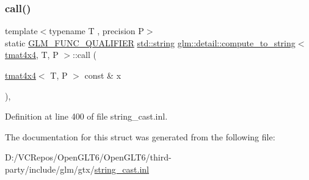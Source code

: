 \subsubsection{\texorpdfstring{call()}{call()}}
{\footnotesize\ttfamily template$<$typename T , precision P$>$ \\
static \mbox{\hyperlink{setup_8hpp_a33fdea6f91c5f834105f7415e2a64407}{G\+L\+M\+\_\+\+F\+U\+N\+C\+\_\+\+Q\+U\+A\+L\+I\+F\+I\+ER}} \mbox{\hyperlink{glad_8h_ac83513893df92266f79a515488701770}{std\+::string}} \mbox{\hyperlink{structglm_1_1detail_1_1compute__to__string}{glm\+::detail\+::compute\+\_\+to\+\_\+string}}$<$ \mbox{\hyperlink{structglm_1_1tmat4x4}{tmat4x4}}, T, P $>$\+::call (\begin{DoxyParamCaption}\item[{\mbox{\hyperlink{structglm_1_1tmat4x4}{tmat4x4}}$<$ T, P $>$ const \&}]{x }\end{DoxyParamCaption})\hspace{0.3cm}{\ttfamily [inline]}, {\ttfamily [static]}}



Definition at line 400 of file string\+\_\+cast.\+inl.



The documentation for this struct was generated from the following file\+:\begin{DoxyCompactItemize}
\item 
D\+:/\+V\+C\+Repos/\+Open\+G\+L\+T6/\+Open\+G\+L\+T6/third-\/party/include/glm/gtx/\mbox{\hyperlink{string__cast_8inl}{string\+\_\+cast.\+inl}}\end{DoxyCompactItemize}
